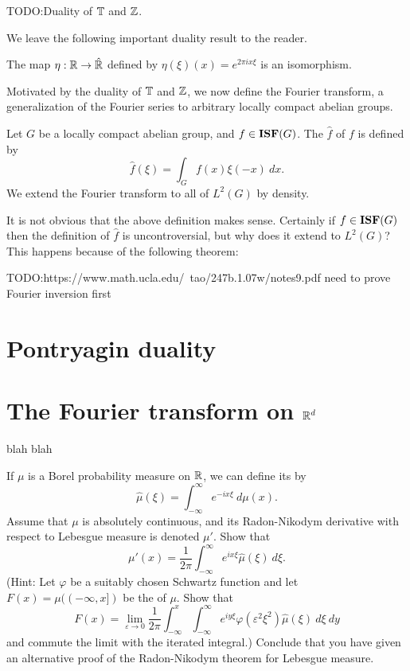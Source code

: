 \begin{example}
TODO:\@ Duality of $\mathbb{T}$ and $\mathbb{Z}$.
\end{example}

We leave the following important duality result to the reader.
\begin{theorem}
The map $\eta: \mathbb{R} \to \hat{\mathbb{R}}$ defined by $\eta(\xi)(x) = e^{2\pi ix\xi}$ is an isomorphism.
\end{theorem}

Motivated by the duality of $\mathbb{T}$ and $\mathbb{Z}$, we now define the Fourier transform, a generalization of the Fourier series to arbitrary locally compact abelian groups.
\begin{definition}
Let $G$ be a locally compact abelian group, and $f \in \mathbf{ISF}(G)$. The  $\hat{f}$ of $f$ is defined by
\[\hat{f}(\xi) = \int_{G} f(x) \xi(-x)~dx.\]
We extend the Fourier transform to all of $L^{2}(G)$ by density.
\end{definition}
It is not obvious that the above definition makes sense. Certainly if $f \in \mathbf{ISF}(G)$ then the definition of $\hat{f}$ is uncontroversial, but why does it extend to $L^{2}(G)$?
This happens because of the following theorem:
\begin{theorem}[Plancherel]
TODO:https://www.math.ucla.edu/~tao/247b.1.07w/notes9.pdf
need to prove Fourier inversion first
\end{theorem}


\section{Pontryagin duality}

\section{The Fourier transform on $\mathbb{R}^{d}$}

blah blah

\begin{exercise}
If $\mu$ is a Borel probability measure on $\mathbb{R}$, we can define its  by
\[\hat{\mu}(\xi) = \int_{-\infty}^{\infty} e^{-ix\xi} ~d\mu(x).\]
Assume that $\mu$ is absolutely continuous, and its Radon-Nikodym derivative with respect to Lebesgue measure is denoted $\mu'$. Show that
\[\mu'(x) = \frac{1}{2\pi} \int_{-\infty}^{\infty} e^{ix\xi} \hat{\mu}(\xi)~d\xi.\]
(Hint: Let $\varphi$ be a suitably chosen Schwartz function and let $F(x) = \mu((-\infty, x])$ be the  of $\mu$. Show that
\[F(x) = \lim_{\varepsilon \to 0} \frac{1}{2\pi} \int_{-\infty}^{x} \int_{-\infty}^{\infty} e^{iy\xi} \varphi(\varepsilon^{2} \xi^{2}) \hat{\mu}(\xi) ~d\xi ~dy\]
and commute the limit with the iterated integral.)
Conclude that you have given an alternative proof of the Radon-Nikodym theorem for Lebesgue measure.
\end{exercise}

